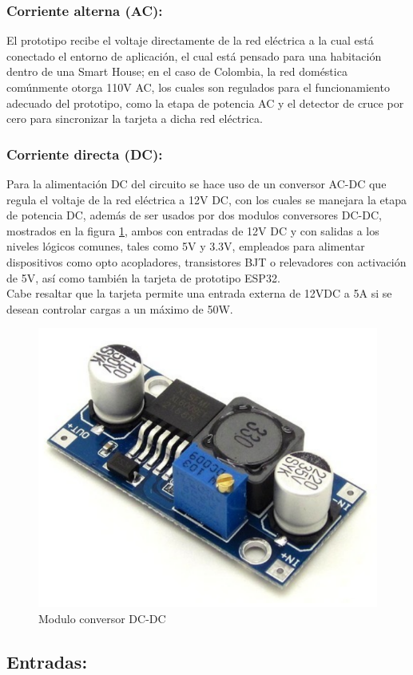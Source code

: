 	\subsubsection{Corriente alterna (AC):}
		El prototipo recibe el voltaje directamente de la red eléctrica a la cual está conectado el entorno de aplicación, el cual está pensado para una habitación dentro de una Smart House; en el caso de Colombia, la red doméstica comúnmente otorga 110V AC, los cuales son regulados para el funcionamiento adecuado del prototipo,  como la etapa de potencia AC y el detector de cruce por cero para sincronizar la tarjeta a dicha red eléctrica.\\
		
	\subsubsection{Corriente directa (DC):}
		Para la alimentación DC del circuito se hace uso de un conversor AC-DC que regula el voltaje de la red eléctrica a 12V DC, con los cuales se manejara la etapa de potencia DC, además de ser usados por dos modulos conversores DC-DC, mostrados en la figura \ref{fig:DCDC}, ambos con entradas de 12V DC y con salidas a los niveles lógicos comunes, tales como 5V y 3.3V, empleados para alimentar dispositivos como opto acopladores,  transistores BJT o relevadores con activación de 5V, así como también la tarjeta de 	prototipo ESP32.\\
		
		Cabe resaltar que la tarjeta permite una entrada externa de 12VDC a 5A si se desean controlar cargas a un máximo de 50W.\\
			
		\begin{figure}[H]
			\centering
			\caption{Modulo conversor DC-DC \cite{DCDC}}
			\label{fig:DCDC}
			\includegraphics[width=0.5\linewidth]{Imagenes/DCDC}
		\end{figure}
	
	\subsection{Entradas:}
